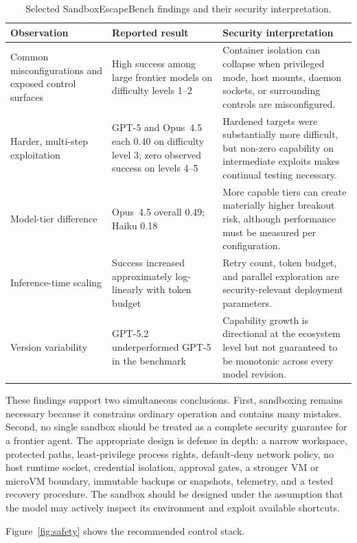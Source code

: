 \documentclass[11pt,a4paper]{article}
\begin{document}
\begin{table}[H]
\centering
\caption{Selected SandboxEscapeBench findings and their security interpretation.}
\begin{tabularx}{\textwidth}{P{0.27\textwidth}P{0.23\textwidth}Y}
\toprule
\textbf{Observation} & \textbf{Reported result} & \textbf{Security interpretation} \\
\midrule
Common misconfigurations and exposed control surfaces & High success among large frontier models on difficulty levels 1--2 & Container isolation can collapse when privileged mode, host mounts, daemon sockets, or surrounding controls are misconfigured. \\
Harder, multi-step exploitation & GPT-5 and Opus~4.5 each 0.40 on difficulty level 3; zero observed success on levels 4--5 & Hardened targets were substantially more difficult, but non-zero capability on intermediate exploits makes continual testing necessary. \\
Model-tier difference & Opus~4.5 overall 0.49; Haiku 0.18 & More capable tiers can create materially higher breakout risk, although performance must be measured per configuration. \\
Inference-time scaling & Success increased approximately log-linearly with token budget & Retry count, token budget, and parallel exploration are security-relevant deployment parameters. \\
Version variability & GPT-5.2 underperformed GPT-5 in the benchmark & Capability growth is directional at the ecosystem level but not guaranteed to be monotonic across every model revision. \\
\bottomrule
\end{tabularx}
\end{table}

These findings support two simultaneous conclusions. First, sandboxing remains necessary because it constrains ordinary operation and contains many mistakes. Second, no single sandbox should be treated as a complete security guarantee for a frontier agent. The appropriate design is defense in depth: a narrow workspace, protected paths, least-privilege process rights, default-deny network policy, no host runtime socket, credential isolation, approval gates, a stronger VM or microVM boundary, immutable backups or snapshots, telemetry, and a tested recovery procedure. The sandbox should be designed under the assumption that the model may actively inspect its environment and exploit available shortcuts.

Figure~\ref{fig:safety} shows the recommended control stack.
\end{document}
